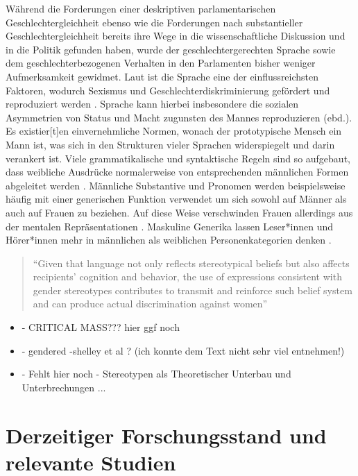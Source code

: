 \documentclass[12pt, 
    twoside=false, 
    bibliography=totoc, 
    numbers=endperiod, 
    headings=normal, 
    toc=chapterentrydotfill
    ]{scrbook}
\begin{document}
Während die Forderungen einer deskriptiven parlamentarischen Geschlechtergleichheit ebenso wie die Forderungen nach substantieller Geschlechtergleichheit bereits ihre Wege in die wissenschaftliche Diskussion und in die Politik gefunden haben, wurde der geschlechtergerechten Sprache sowie dem geschlechterbezogenen Verhalten in den Parlamenten bisher weniger Aufmerksamkeit gewidmet. 
Laut \textcite{menegatti_2017} ist die Sprache eine der einflussreichsten Faktoren, wodurch Sexismus und Geschlechterdiskriminierung gefördert und reproduziert werden \parencite*[1]{menegatti_2017}. Sprache kann hierbei insbesondere die sozialen Asymmetrien von Status und Macht zugunsten des Mannes reproduzieren (ebd.). Es existier[t]en einvernehmliche Normen, wonach der prototypische Mensch ein Mann ist, was sich in den Strukturen vieler Sprachen widerspiegelt und darin verankert ist. Viele grammatikalische und syntaktische Regeln sind so aufgebaut, dass weibliche Ausdrücke normalerweise von entsprechenden männlichen Formen abgeleitet werden \parencite*[1]{menegatti_2017}. Männliche Substantive und Pronomen werden beispielsweise häufig mit einer generischen Funktion verwendet um sich sowohl auf Männer als auch auf Frauen zu beziehen. Auf diese Weise verschwinden Frauen allerdings aus der mentalen Repräsentationen \parencites{vaughan_2018}{stahlberg_2001}. Maskuline Generika lassen Leser*innen und Hörer*innen mehr in männlichen als weiblichen Personenkategorien denken \parencites[2]{sczesny_2016}{stahlberg_2007}.

\begin{quote}
    \enquote{Given that language not only reflects stereotypical beliefs but also affects recipients’ cognition and behavior, the use of expressions consistent with gender stereotypes contributes to transmit and reinforce such belief system and can produce actual discrimination against women} \parencite[2]{menegatti_2017}
\end{quote}

\begin{itemize}
\item - CRITICAL MASS???  hier ggf noch 
\item - gendered -shelley et al ? (ich konnte dem Text nicht sehr viel entnehmen!) 
\item - Fehlt hier noch - Stereotypen als Theoretischer Unterbau und Unterbrechungen ...
\end{itemize}



\section {Derzeitiger Forschungsstand und relevante Studien }
\end{document}
